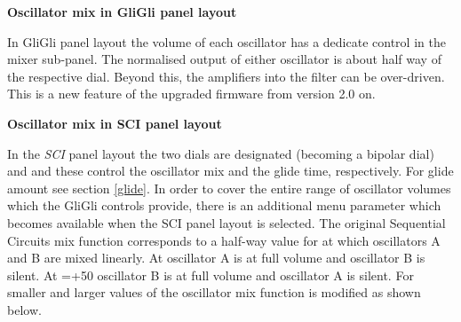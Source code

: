 \textbf{Oscillator mix in GliGli panel layout}

In GliGli panel layout the volume of each oscillator has a dedicate control in the mixer sub-panel. The normalised output of either oscillator is about half way of the respective dial. Beyond this, the amplifiers into the filter can be over-driven. This is a new feature of the upgraded firmware from version 2.0 on.

\textbf{Oscillator mix in SCI panel layout}

In the \textit{SCI} panel layout the two dials are designated \mixer (becoming a bipolar dial) and \glidepot and these control the oscillator mix and the glide time, respectively. For glide amount see section \ref{glide}. In order to cover the entire range of oscillator volumes which the GliGli controls provide, there is an additional menu parameter \drive which becomes available when the SCI panel layout is selected. The original Sequential Circuits mix function corresponds to a half-way value for \drive at which oscillators A and B are mixed linearly. At  oscillator A is at full volume and oscillator B is silent. At \mixer =+50 oscillator B is at full volume and oscillator A is silent.  For smaller and larger values of \drive the oscillator mix function is modified as shown below.


